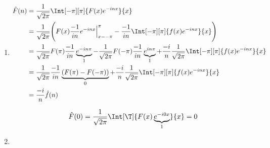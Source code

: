 \begin{solution}

\phantom{}

\begin{enumerate}[label = (\roman*)]

    \item \phantom{}
    
    \begin{align*}
        \hat F(n)
        & =
        \frac{1}{\sqrt{2 \pi}}
        \Int[-\pi][\pi]
        {
            F(x)
            e^{-i n x}
        }{x} \\
        & =
        \frac{1}{\sqrt{2 \pi}}
        \Bigg (
            F(x) \frac{-1}{i n} e^{-i n x} \Big |_{x = -\pi}^\pi
            -
            \frac{-1}{i n}
            \Int[-\pi][\pi]
            {
                f(x)
                e^{-i n x}
            }{x}    
        \Bigg ) \\
        & =
        \frac{1}{\sqrt{2 \pi}}
        F(\pi) \frac{-1}{i n} \underbrace{e^{-i n \pi}}_1
        -
        \frac{1}{\sqrt{2 \pi}}
        F(-\pi) \frac{-1}{i n} \underbrace{e^{i n \pi}}_1
        +
        \frac{-i}{n}
        \frac{1}{\sqrt{2 \pi}}
        \Int[-\pi][\pi]
        {
            f(x)
            e^{-i n x}
        }{x} \\
        & =
        \frac{1}{\sqrt{2 \pi}}
        \frac{-1}{i n}
        \underbrace
        {
            (
                F(\pi)
                -
                F(-\pi)
            )
        }_0
        +
        \frac{-i}{n}
        \frac{1}{\sqrt{2 \pi}}
        \Int[-\pi][\pi]
        {
            f(x)
            e^{-i n x}
        }{x} \\
        & =
        \frac{-i}{n}
        \hat f(n)
    \end{align*}

    \begin{align*}
        \hat F(0)
        =
        \frac{1}{\sqrt{2 \pi}}
        \Int[\T]
        {
            F(x)
            \underbrace{e^{-i 0 x}}_1
        }{x}
        =
        0
    \end{align*}

    \item \phantom{}
    


\end{enumerate}
\end{solution}
